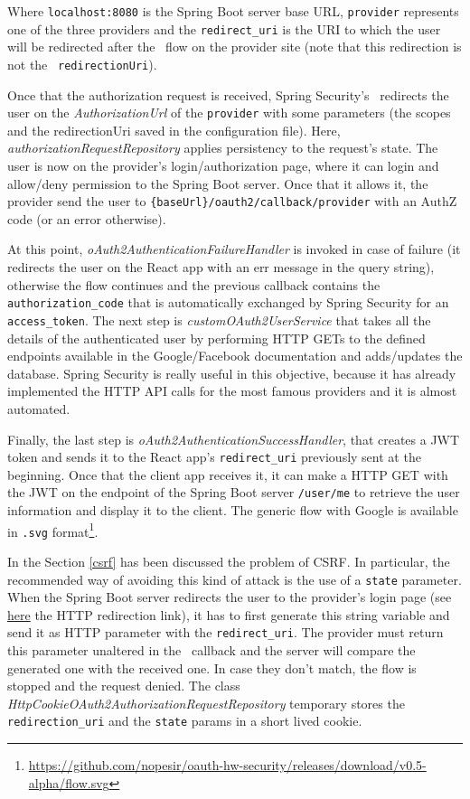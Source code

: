 \noindent Where \texttt{localhost:8080} is the Spring Boot server base URL, \texttt{provider} represents one of the three providers and the \texttt{redirect\_uri} is the URI to which the user will be redirected after the \oauth\ flow on the provider site (note that this redirection is not the \oauth\ \texttt{redirectionUri}).

Once that the authorization request is received, Spring Security's \oauth\ redirects the user on the \textit{AuthorizationUrl} of the \texttt{provider} with some parameters (the scopes and the redirectionUri saved in the configuration file). Here, \textit{authorizationRequestRepository} applies persistency to the request's state. The user is now on the provider's login/authorization page, where it can login and allow/deny permission to the Spring Boot server. Once that it allows it, the provider send the user to \texttt{\{baseUrl\}/oauth2/callback/provider} with an AuthZ code (or an error otherwise).

At this point, \textit{oAuth2AuthenticationFailureHandler} is invoked in case of failure (it redirects the user on the React app with an err message in the query string), otherwise the flow continues and the previous callback contains the \texttt{authorization\_code} that is automatically exchanged by Spring Security for an \texttt{access\_token}. The next step is \textit{customOAuth2UserService} that takes all the details of the authenticated user by performing HTTP GETs to the defined endpoints available in the Google/Facebook documentation and adds/updates the database. Spring Security is really useful in this objective, because it has already implemented the HTTP API calls for the most famous providers and it is almost automated. 

Finally, the last step is \textit{oAuth2AuthenticationSuccessHandler}, that creates a JWT token and sends it to the React app's \texttt{redirect\_uri} previously sent at the beginning. Once that the client app receives it, it can make a HTTP GET with the JWT on the endpoint of the Spring Boot server \texttt{/user/me} to retrieve the user information and display it to the client. The generic flow with Google is available in \texttt{.svg} format\footnote{\url{https://github.com/nopesir/oauth-hw-security/releases/download/v0.5-alpha/flow.svg}}.


In the Section \ref{csrf} has been discussed the problem of CSRF. In particular, the recommended way of avoiding this kind of attack is the use of a \texttt{state} parameter. When the Spring Boot server redirects the user to the provider's login page (see \hyperlink{foo}{here} the HTTP redirection link), it has to first generate this string variable and send it as HTTP parameter with the \texttt{redirect\_uri}. The provider must return this parameter unaltered in the \oauth\ callback and the server will compare the generated one with the received one. In case they don't match, the flow is stopped and the request denied.
The class \textit{HttpCookieOAuth2AuthorizationRequestRepository} temporary stores the \texttt{redirection\_uri} and the \texttt{state} params in a short lived cookie.

